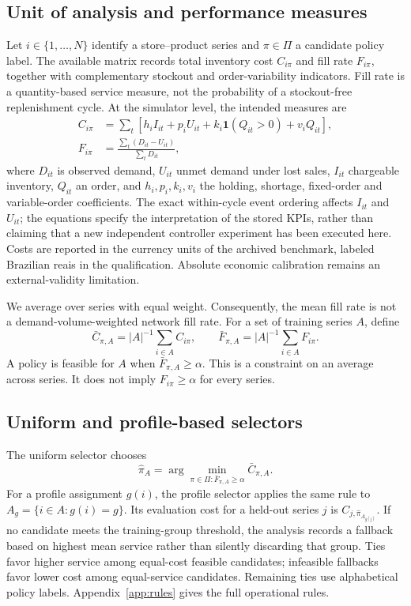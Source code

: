 \documentclass[preprint,12pt]{elsarticle}
\begin{document}
\subsection{Unit of analysis and performance measures}
Let $i\in\{1,\ldots,N\}$ identify a store--product series and $\pi\in\Pi$ a candidate policy label. The available matrix records total inventory cost $C_{i\pi}$ and fill rate $F_{i\pi}$, together with complementary stockout and order-variability indicators. Fill rate is a quantity-based service measure, not the probability of a stockout-free replenishment cycle. At the simulator level, the intended measures are
\begin{align}
 C_{i\pi}&=\sum_t\left[h_i I_{it}+p_i U_{it}+k_i\mathbf{1}(Q_{it}>0)+v_iQ_{it}\right],\\
 F_{i\pi}&=\frac{\sum_t(D_{it}-U_{it})}{\sum_tD_{it}},
\end{align}
where $D_{it}$ is observed demand, $U_{it}$ unmet demand under lost sales, $I_{it}$ chargeable inventory, $Q_{it}$ an order, and $h_i,p_i,k_i,v_i$ the holding, shortage, fixed-order and variable-order coefficients. The exact within-cycle event ordering affects $I_{it}$ and $U_{it}$; the equations specify the interpretation of the stored KPIs, rather than claiming that a new independent controller experiment has been executed here. Costs are reported in the currency units of the archived benchmark, labeled Brazilian reais in the qualification. Absolute economic calibration remains an external-validity limitation.

We average over series with equal weight. Consequently, the mean fill rate is not a demand-volume-weighted network fill rate. For a set of training series $A$, define
\begin{equation}
 \bar C_{\pi,A}=|A|^{-1}\sum_{i\in A}C_{i\pi},\qquad
 \bar F_{\pi,A}=|A|^{-1}\sum_{i\in A}F_{i\pi}.
\end{equation}
A policy is feasible for $A$ when $\bar F_{\pi,A}\geq\alpha$. This is a constraint on an average across series. It does not imply $F_{i\pi}\geq\alpha$ for every series.

\subsection{Uniform and profile-based selectors}
The uniform selector chooses
\begin{equation}
 \widehat\pi_A=\arg\min_{\pi\in\Pi:\bar F_{\pi,A}\geq\alpha}\bar C_{\pi,A}.
\end{equation}
For a profile assignment $g(i)$, the profile selector applies the same rule to $A_g=\{i\in A:g(i)=g\}$. Its evaluation cost for a held-out series $j$ is $C_{j,\widehat\pi_{A_{g(j)}}}$. If no candidate meets the training-group threshold, the analysis records a fallback based on highest mean service rather than silently discarding that group. Ties favor higher service among equal-cost feasible candidates; infeasible fallbacks favor lower cost among equal-service candidates. Remaining ties use alphabetical policy labels. Appendix~\ref{app:rules} gives the full operational rules.
\end{document}
